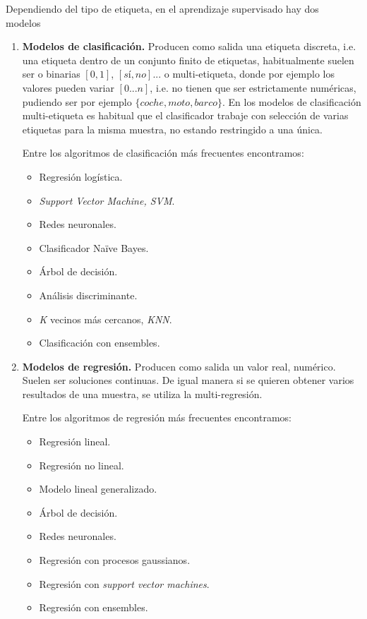 Dependiendo del tipo de etiqueta, en el aprendizaje supervisado hay dos modelos~\cite{supervised_learning_mathworks_inc}
\begin{enumerate}
	\item \textbf{Modelos de clasificación.} Producen como salida una etiqueta discreta, i.e. una etiqueta dentro de un conjunto finito de etiquetas, habitualmente suelen ser o binarias $[0,1]$, $[sí,no]$... o multi-etiqueta, donde por ejemplo los valores pueden variar $[0...n]$, i.e. no tienen que ser estrictamente numéricas, pudiendo ser por ejemplo $\lbrace coche, moto, barco\rbrace$. En los modelos de clasificación multi-etiqueta es habitual que el clasificador trabaje con selección de varias etiquetas para la misma muestra, no estando restringido a una única.

Entre los algoritmos de clasificación más frecuentes encontramos:
	\begin{itemize}
	\item Regresión logística.
	\item \textit{Support Vector Machine, SVM}.
	\item Redes neuronales.
	\item Clasificador Naïve Bayes.
	\item Árbol de decisión.
	\item Análisis discriminante.
	\item \textit{K} vecinos más cercanos, \textit{KNN}.
	\item Clasificación con ensembles.
	\end{itemize}
	\item \textbf{Modelos de regresión.} Producen como salida un valor real, numérico. Suelen ser soluciones continuas. De igual manera si se quieren obtener varios resultados de una muestra, se utiliza la multi-regresión. 
	
	Entre los algoritmos de regresión más frecuentes encontramos:
	\begin{itemize}
	\item Regresión lineal.
	\item Regresión no lineal.
	\item Modelo lineal generalizado.
	\item Árbol de decisión.
	\item Redes neuronales.
	\item Regresión con procesos gaussianos.
	\item Regresión con \textit{support vector machines}.
	\item Regresión con ensembles.
	\end{itemize}
	
\end{enumerate}

